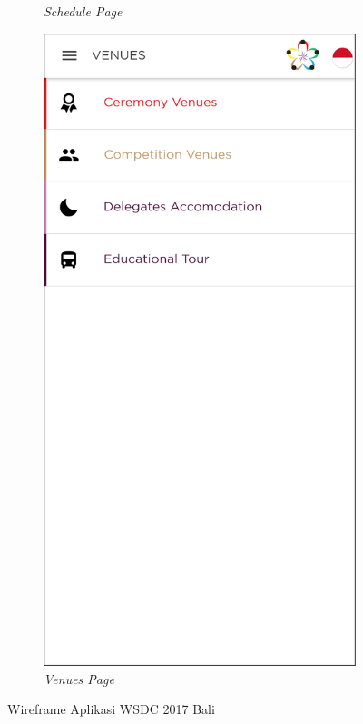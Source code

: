\begin{figure}[H]
\begin{subfigure}[b]{0.24\textwidth}
	    \caption{{\it Schedule Page}}
	    \label{fig:wsdcAppSchedule}
     \end{subfigure}
	\begin{subfigure}[b]{0.24\textwidth}
    \centering
	    \includegraphics[scale=0.37]{Gambar/VenuePage.png}
	    \caption{\textit{Venues Page}}
	    \label{fig:wsdcAppVenues} 
     \end{subfigure}
	\caption{Wireframe Aplikasi WSDC 2017 Bali}
        \label{fig:ssAppWSDC2017Bali2}
\end{figure}

